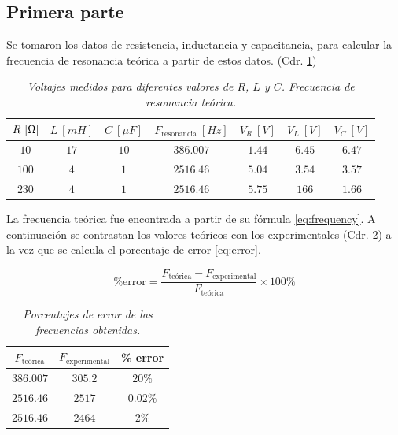 \documentclass[spanish,notitlepage,letterpaper, 12pt]{article}
\begin{document}
\subsection{Primera parte}
Se tomaron los datos de resistencia, inductancia y capacitancia, para calcular la frecuencia de resonancia teórica a partir de estos datos. (Cdr. \ref{tab:rlc})\par
\begin{table}[ht]
    \centering
    \begin{tabular}{|c|c|c|c|c|c|c|}
        \hline
        $R\ [\ohm]$ & $L\ [mH]$ & $C\ [\mu F]$ & $F_{\text{resonancia}}\ [Hz]$ & $V_R\ [V]$ & $V_L\ [V]$ & $V_C\ [V]$ \\
        \hline\hline
        $10$ & $17$ & $10$ & $386.007$ & $1.44$ & $6.45$ & $6.47$\\
        $100$ & $4$ & $1$ & $2516.46$ & $5.04$ & $3.54$ & $3.57$\\
        $230$ & $4$ & $1$ & $2516.46$ & $5.75$ & $166$ & $1.66$\\
        \hline
    \end{tabular}
    \caption{\textit{Voltajes medidos para diferentes valores de $R$, $L$ y $C$. Frecuencia de resonancia teórica.}}
    \label{tab:rlc}
\end{table}
La frecuencia teórica fue encontrada a partir de su fórmula \eqref{eq:frequency}. A continuación se contrastan los valores teóricos con los experimentales (Cdr. \ref{tab:frequ}) a la vez que se calcula el porcentaje de error \eqref{eq:error}.\par
\begin{equation}\label{eq:error}
    \text{\% error}=\frac{F_{\text{teórica}}-F_{\text{experimental}}}{F_{\text{teórica}}}\times100\%
\end{equation}
\begin{table}[ht]
    \centering
    \begin{tabular}{|c|c|c|}
        \hline
        $F_{\text{teórica}}$ & $F_{\text{experimental}}$ & \% error\\
        \hline\hline
        $386.007$ & $305.2$ & $20\%$\\
        $2516.46$ & $2517$ & $0.02\%$\\
        $2516.46$ & $2464$ & $2\%$\\
        \hline
    \end{tabular}
    \caption{\textit{Porcentajes de error de las frecuencias obtenidas.}}
    \label{tab:frequ}
\end{table}
\end{document}

